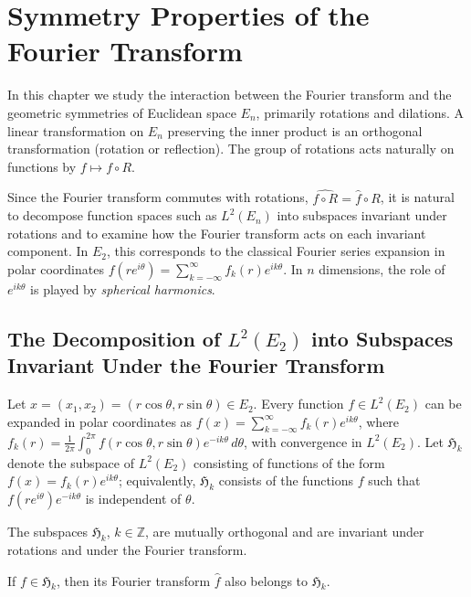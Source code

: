 \chapter{Symmetry Properties of the Fourier Transform}
\label{ch:symmetry}

In this chapter we study the interaction between the Fourier transform and the geometric symmetries of Euclidean space $E_n$, primarily rotations and dilations. A linear transformation on $E_n$ preserving the inner product is an orthogonal transformation (rotation or reflection). The group of rotations acts naturally on functions by $f \mapsto f \circ R$.

Since the Fourier transform commutes with rotations, $\widehat{f \circ R} = \hat{f} \circ R$, it is natural to decompose function spaces such as $L^2(E_n)$ into subspaces invariant under rotations and to examine how the Fourier transform acts on each invariant component. In $E_2$, this corresponds to the classical Fourier series expansion in polar coordinates $f(r e^{i\theta}) = \sum_{k=-\infty}^\infty f_k(r) e^{ik\theta}$. In $n$ dimensions, the role of $e^{ik\theta}$ is played by \emph{spherical harmonics}.

\section{The Decomposition of \texorpdfstring{$L^2(E_2)$}{L2(E2)} into Subspaces Invariant Under the Fourier Transform}

Let $x = (x_1, x_2) = (r \cos\theta, r \sin\theta) \in E_2$. Every function $f \in L^2(E_2)$ can be expanded in polar coordinates as $f(x) = \sum_{k=-\infty}^\infty f_k(r) e^{ik\theta}$, where $f_k(r) = \frac{1}{2\pi} \int_0^{2\pi} f(r\cos\theta, r\sin\theta) e^{-ik\theta}\,d\theta$, with convergence in $L^2(E_2)$. Let $\mathfrak{H}_k$ denote the subspace of $L^2(E_2)$ consisting of functions of the form $f(x) = f_k(r) e^{ik\theta}$; equivalently, $\mathfrak{H}_k$ consists of the functions $f$ such that $f(re^{i\theta}) e^{-ik\theta}$ is independent of $\theta$.

\begin{theorem}\label{thm:c4-1-1}
The subspaces $\mathfrak{H}_k$, $k \in \mathbb{Z}$, are mutually orthogonal and are invariant under rotations and under the Fourier transform.
\end{theorem}

\begin{corollary}\label{cor:c4-1-2}
If $f \in \mathfrak{H}_k$, then its Fourier transform $\hat{f}$ also belongs to $\mathfrak{H}_k$.
\end{corollary}

